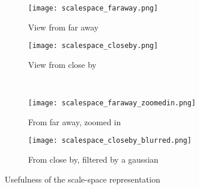 \begin{figure}[H]
\centering
\begin{subfigure}{.4\textwidth}
  \centering
  \texttt{[image: scalespace\_faraway.png]}
  \caption{View from far away}
  \label{fig:scalespace_faraway}
\end{subfigure}%
\begin{subfigure}{.4\textwidth}
  \centering
  \texttt{[image: scalespace\_closeby.png]}
  \caption{View from close by}
  \label{fig:scalespace_closeby}
\end{subfigure} \\
\begin{subfigure}{.4\textwidth}
  \centering
  \texttt{[image: scalespace\_faraway\_zoomedin.png]}
  \caption{From far away, zoomed in}
  \label{fig:scalespace_faraway_zoomedin}
\end{subfigure}%
\begin{subfigure}{.4\textwidth}
  \centering
  \texttt{[image: scalespace\_closeby\_blurred.png]}
  \caption{From close by, filtered by a gaussian}
  \label{fig:scalespace_closeby_blurred}
\end{subfigure}
\caption{Usefulness of the scale-space representation}
\label{fig:scalespace}
\end{figure}

